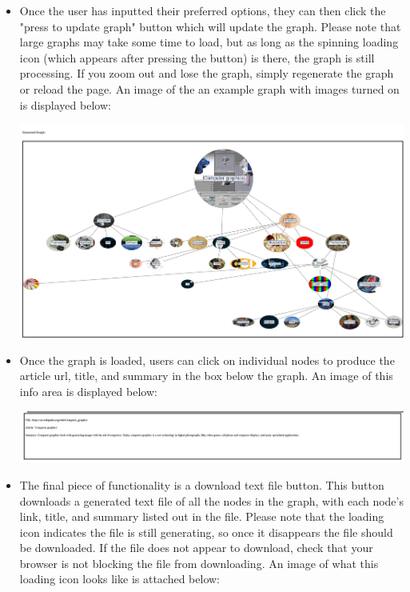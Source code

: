 \documentclass[fontsize=11pt]{article}
\begin{document}
\begin{enumerate}
\begin{itemize}
        \item Once the user has inputted their preferred options, they can then click the "press to update graph" button which will update the graph. Please note that large graphs may take some time to load, but as long as the spinning loading icon (which appears after pressing the button) is there, the graph is still processing. If you zoom out and lose the graph, simply regenerate the graph or reload the page. An image of the an example graph with images turned on is displayed below:
        
        \includegraphics[scale=0.25]{graph_with_images.png}
        
        \item Once the graph is loaded, users can click on individual nodes to produce the article url, title, and summary in the box below the graph. An image of this info area is displayed below:
        
        \includegraphics[scale=0.25]{graph_node_info_box.png}
        
        \newpage
        
        \item The final piece of functionality is a download text file button. This button downloads a generated text file of all the nodes in the graph, with each node's link, title, and summary listed out in the file. Please note that the loading icon indicates the file is still generating, so once it disappears the file should be downloaded. If the file does not appear to download, check that your browser is not blocking the file from downloading. An image of what this loading icon looks like is attached below:
        

\end{itemize}
\end{enumerate}
\end{document}

